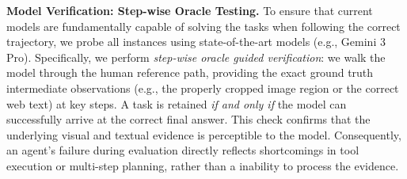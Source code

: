 \documentclass[runningheads]{llncs}
\theoremstyle{plain}
\theoremstyle{definition}
\theoremstyle{remark}
\begin{document}
\vspace{1mm}
\noindent\textbf{Model Verification: Step-wise Oracle Testing.}
To ensure that current models are fundamentally capable of solving the tasks when following the correct trajectory, we probe all instances using state-of-the-art models (e.g., Gemini 3 Pro). Specifically, we perform \textit{step-wise oracle guided verification}: we walk the model through the human reference path, providing the exact ground truth intermediate observations (e.g., the properly cropped image region or the correct web text) at key steps. A task is retained \emph{if and only if} the model can successfully arrive at the correct final answer. This check confirms that the underlying visual and textual evidence is perceptible to the model. Consequently, an agent's failure during evaluation directly reflects shortcomings in tool execution or multi-step planning, rather than a inability to process the evidence.
\end{document}

